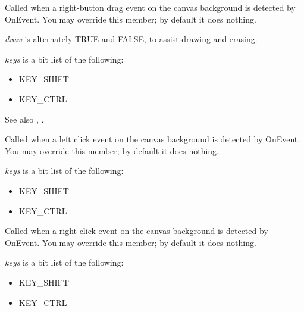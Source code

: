 
Called when a right-button drag event on the canvas background is detected by OnEvent. You may override this member;
by default it does nothing.

{\it draw} is alternately TRUE and FALSE, to assist drawing and erasing.

{\it keys} is a bit list of the following:

\begin{itemize}\itemsep=0pt
\item KEY\_SHIFT
\item KEY\_CTRL
\end{itemize}

See also , .

\label{wxshapecanvasonleftclick}


Called when a left click event on the canvas background is detected by OnEvent. You may override this member;
by default it does nothing.

{\it keys} is a bit list of the following:

\begin{itemize}\itemsep=0pt
\item KEY\_SHIFT
\item KEY\_CTRL
\end{itemize}

\label{wxshapecanvasonrightclick}


Called when a right click event on the canvas background is detected by OnEvent. You may override this member;
by default it does nothing.

{\it keys} is a bit list of the following:

\begin{itemize}\itemsep=0pt
\item KEY\_SHIFT
\item KEY\_CTRL
\end{itemize}


